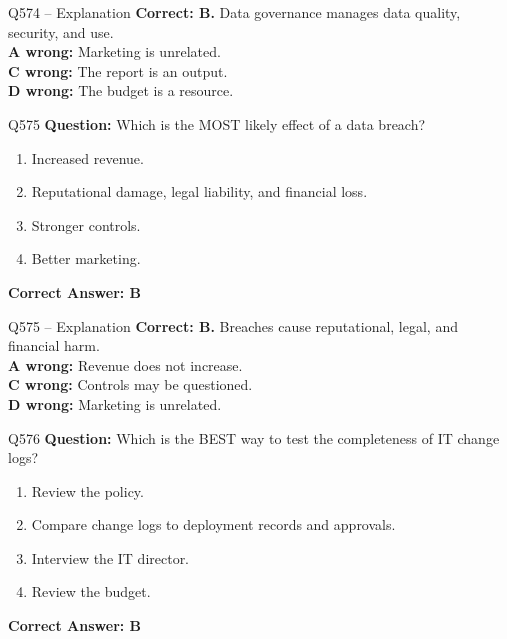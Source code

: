 \documentclass[aspectratio=169,10pt]{beamer}
\begin{document}
	\begin{frame}[t]{Q574 -- Explanation}
		\small
		\textbf{Correct: B.} Data governance manages data quality, security, and use. \\[4pt]
		\textbf{A wrong:} Marketing is unrelated. \\[2pt]
		\textbf{C wrong:} The report is an output. \\[2pt]
		\textbf{D wrong:} The budget is a resource.
	\end{frame}
	
	\begin{frame}[t]{Q575}
		\small
		\textbf{Question:} Which is the MOST likely effect of a data breach?
		\begin{enumerate}[label=\Alph*.,itemsep=1pt,topsep=2pt]
			\item Increased revenue.
			\item Reputational damage, legal liability, and financial loss.
			\item Stronger controls.
			\item Better marketing.
		\end{enumerate}
		\vspace{4pt}
		\textbf{Correct Answer: B}
	\end{frame}
	
	\begin{frame}[t]{Q575 -- Explanation}
		\small
		\textbf{Correct: B.} Breaches cause reputational, legal, and financial harm. \\[4pt]
		\textbf{A wrong:} Revenue does not increase. \\[2pt]
		\textbf{C wrong:} Controls may be questioned. \\[2pt]
		\textbf{D wrong:} Marketing is unrelated.
	\end{frame}
	
	\begin{frame}[t]{Q576}
		\small
		\textbf{Question:} Which is the BEST way to test the completeness of IT change logs?
		\begin{enumerate}[label=\Alph*.,itemsep=1pt,topsep=2pt]
			\item Review the policy.
			\item Compare change logs to deployment records and approvals.
			\item Interview the IT director.
			\item Review the budget.
		\end{enumerate}
		\vspace{4pt}
		\textbf{Correct Answer: B}
	\end{frame}
	
\end{document}
